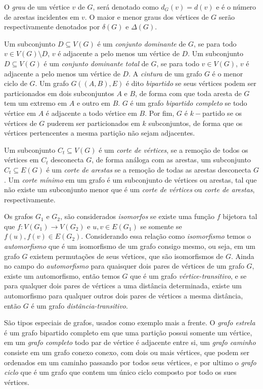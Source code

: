 O \textit{grau}  de um vértice $v$ de $G$, será denotado como $d_G(v)=d(v)$ e é o número de arestas incidentes em $v$. O maior e menor graus dos vértices de $G$ serão respectivamente denotados por $\delta(G)$ e $\Delta(G)$. 

Um subconjunto $D \subseteq V(G)$ é um \textit{conjunto dominante} de $G$, se para todo $v \in V(G) \setminus D$, $v$ é adjacente a pelo menos um vértice de $D$. Um subconjunto $D \subseteq V(G)$ é um \textit{conjunto dominante total} de $G$, se para todo $v \in V(G)$, $v$ é adjacente a pelo menos um vértice de $D$.  A \textit{cintura} de um grafo $G$ é o menor ciclo de $G$. Um grafo $G((A,B),E)$ é dito \textit{bipartido} se seus vértices podem ser particionados em dois subconjuntos $A$ e $B$, de forma com que toda aresta de $G$ tem um extremo em $A$ e outro em $B$. $G$ é um grafo \textit{bipartido completo} se todo vértice em $A$ é adjacente a todo vértice em $B$. Por fim, $G$ é $k-$partido se os vértices de $G$ puderem ser particionados em $k$ subconjuntos, de forma que os vértices pertencentes a mesma partição não sejam adjacentes.

Um subconjunto $C_t \subseteq V(G)$ é um \textit{corte de vértices}, se a remoção de todos os vértices em $C_t$ desconecta $G$, de forma análoga com as arestas, um subconjunto $C_t \subseteq E(G)$ é um \textit{corte de arestas} se a remoção de todas as arestas desconecta $G$. Um \textit{corte mínimo} em um grafo é um subconjunto de vértices ou arestas, tal que não existe um subconjunto menor que é um \textit{corte de vértices} ou \textit{corte de arestas}, respectivamente.

Os grafos $G_1$ e $G_2$, são considerados \textit{isomorfos} se existe uma função $f$ bijetora tal que $f: V(G_1) \to V(G_2)$ e $u,v\in E(G_1)$ se somente se $f(u),f(v) \in E(G_2)$. Considerando essa relação como \textit{isomorfismo} temos o \textit{automorfismo} que é um isomorfismo de um grafo consigo mesmo, ou seja, em um grafo $G$ existem permutações de seus vértices, que são isomorfismos de $G$. Ainda no campo do \textit{automorfismo} para quaisquer dois pares de vértices de um grafo $G$, existe um automorfismo, então temos $G$ que é um grafo \textit{vértice-transitivo}, e se para qualquer dois pares de vértices a uma distância determinada, existe um automorfismo para qualquer outros dois pares de vértices a mesma distância, então $G$ é um grafo \textit{distância-transitivo}.


São tipos especiais de grafos, usados como exemplo mais a frente. O \textit{grafo estrela} é um grafo bipartido completo em que uma partição possui somente um vértice, em um \textit{grafo completo} todo par de vértice é adjacente entre si, um \textit{grafo caminho} consiste em um grafo conexo conexo, com dois ou mais vértices, que podem ser ordenados em um caminho passando por todos seus vértices, e por ultimo o \textit{grafo ciclo} que é um grafo que contem um único ciclo composto por todo os sues vértices. 


